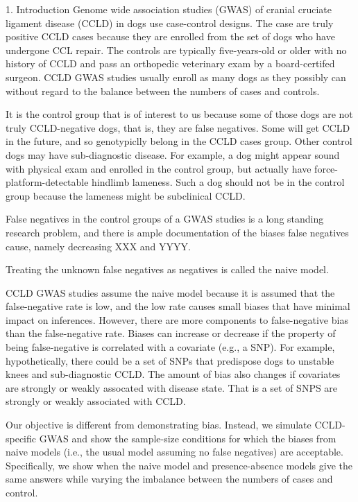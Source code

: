 
1. Introduction
Genome wide association studies (GWAS) of cranial cruciate ligament disease (CCLD) in dogs use case-control designs. The case are truly positive CCLD cases because they are enrolled from the set of dogs who have undergone CCL repair. The controls are typically five-years-old or older with no history of CCLD and pass an orthopedic veterinary exam by a board-certifed surgeon. CCLD GWAS studies usually enroll as many dogs as they possibly can without regard to the balance between the numbers of cases and controls.

It is the control group that is of interest to us because some of those dogs are not truly CCLD-negative dogs, that is, they are false negatives. Some will get CCLD in the future, and so genotypiclly belong in the CCLD cases group. Other control dogs may have sub-diagnostic disease. For example, a dog might appear sound with physical exam and enrolled in the control group, but actually have force-platform-detectable hindlimb lameness. Such a dog should not be in the control group because the lameness might be subclinical CCLD. 

False negatives in the control groups of a GWAS studies is a long standing research problem, and there is ample documentation of the biases false negatives cause, namely decreasing XXX and YYYY. 

Treating the unknown false negatives as negatives is called the naive model. 

CCLD GWAS studies assume the naive model because it is assumed that the false-negative rate is low, and the low rate causes small biases that have minimal impact on inferences. However, there are more components to false-negative bias than the false-negative rate. Biases can increase or decrease if the property of being false-negative is correlated with a covariate (e.g., a SNP). For example, hypothetically, there could be a set of SNPs that predispose dogs to unstable knees and sub-diagnostic CCLD. The amount of bias also changes if covariates are strongly or weakly assocated with disease state. That is a set of SNPS are strongly or weakly associated with CCLD. 

Our objective is different from demonstrating bias. Instead, we simulate CCLD-specific GWAS and show the sample-size conditions for which the biases from naive models (i.e., the usual model assuming no false negatives) are acceptable. Specifically, we show when the naive model and presence-absence models give the same answers while varying the imbalance between the numbers of cases and control.   

